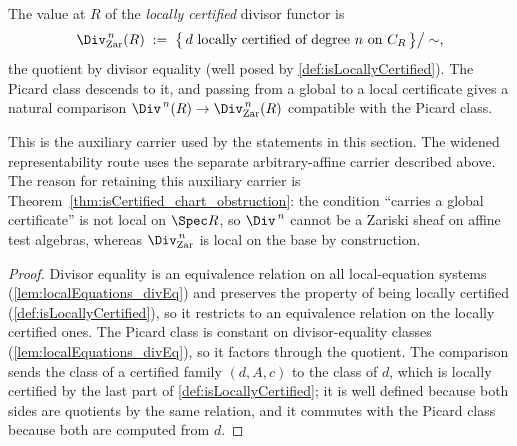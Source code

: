 \begin{definition}
  \label{def:divFamZar}
  \leanok
  The value at \(R\) of the \emph{locally certified} divisor functor is
  \[
    \Div^{\,n}_{\mathrm{Zar}}(R) \;:=\;
      \bigl\{\, d \text{ locally certified of degree } n \text{ on } C_R \,\bigr\} \big/ \sim ,
  \]
  the quotient by divisor equality (well posed by \ref{def:isLocallyCertified}). The Picard
  class descends to it, and passing from a global to a local certificate gives a natural
  comparison \(\Div^{\,n}(R) \to \Div^{\,n}_{\mathrm{Zar}}(R)\) compatible with the Picard
  class.

  This is the auxiliary carrier used by the statements in this section. The widened
  representability route uses the separate arbitrary-affine carrier described above. The reason
  for retaining this auxiliary carrier is
  Theorem~\ref{thm:isCertified_chart_obstruction}: the condition ``carries a global
  certificate'' is not local on \(\Spec R\), so \(\Div^{\,n}\) cannot be a Zariski sheaf on
  affine test algebras, whereas \(\Div^{\,n}_{\mathrm{Zar}}\) is local on the base by
  construction.
\end{definition}
\begin{proof}
  \leanok
  Divisor equality is an equivalence relation on all local-equation systems
  (\ref{lem:localEquations_divEq}) and preserves the property of being locally certified
  (\ref{def:isLocallyCertified}), so it restricts to an equivalence relation on the locally
  certified ones. The Picard class is constant on divisor-equality classes
  (\ref{lem:localEquations_divEq}), so it factors through the quotient. The comparison
  sends the class of a certified family \((d,A,c)\) to the class of \(d\), which is locally
  certified by the last part of \ref{def:isLocallyCertified}; it is well defined because
  both sides are quotients by the same relation, and it commutes with the Picard class
  because both are computed from \(d\).
\end{proof}

